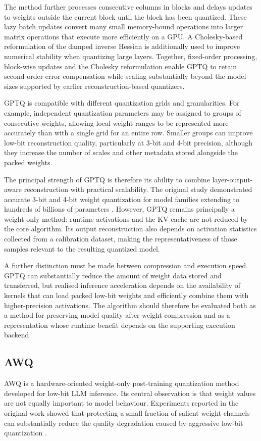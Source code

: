 The method further processes consecutive columns in blocks and delays
updates to weights outside the current block until the block has been
quantized. These lazy batch updates convert many small memory-bound
operations into larger matrix operations that execute more efficiently
on a GPU. A Cholesky-based reformulation of the damped inverse Hessian
is additionally used to improve numerical stability when quantizing
large layers. Together, fixed-order processing, block-wise updates and
the Cholesky reformulation enable GPTQ to retain second-order error
compensation while scaling substantially beyond the model sizes
supported by earlier reconstruction-based quantizers.

GPTQ is compatible with different quantization grids and granularities.
For example, independent quantization parameters may be assigned to
groups of consecutive weights, allowing local weight ranges to be
represented more accurately than with a single grid for an entire row.
Smaller groups can improve low-bit reconstruction quality, particularly
at 3-bit and 4-bit precision, although they increase the number of
scales and other metadata stored alongside the packed weights.

The principal strength of GPTQ is therefore its ability to combine
layer-output-aware reconstruction with practical scalability. The
original study demonstrated accurate 3-bit and 4-bit weight
quantization for model families extending to hundreds of billions of
parameters \cite{frantar2023gptqaccurateposttrainingquantization}. However, GPTQ remains principally a weight-only method: runtime activations and the KV cache are not reduced by the core algorithm. Its output reconstruction also depends on
activation statistics collected from a calibration dataset, making the
representativeness of those samples relevant to the resulting
quantized model.

A further distinction must be made between compression and execution
speed. GPTQ can substantially reduce the amount of weight data stored
and transferred, but realised inference acceleration depends on the
availability of kernels that can load packed low-bit weights and
efficiently combine them with higher-precision activations. The
algorithm should therefore be evaluated both as a method for preserving
model quality after weight compression and as a representation whose
runtime benefit depends on the supporting execution backend.

\subsection{\ac{AWQ}}
\ac{AWQ} is a hardware-oriented weight-only post-training quantization
method developed for low-bit LLM inference. Its central observation is
that weight values are not equally important to model behaviour.
Experiments reported in the original work showed that protecting a
small fraction of salient weight channels can substantially reduce the
quality degradation caused by aggressive low-bit quantization
\cite{lin2026awqactivationawareweightquantization}.

